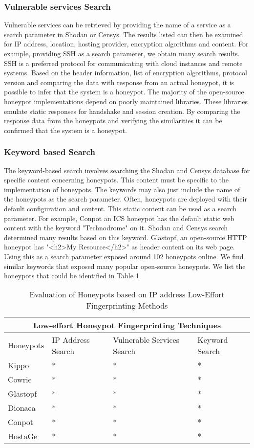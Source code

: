 \documentclass[../main.tex]{subfiles}
\begin{document}
 \subsubsection{Vulnerable services Search}
 Vulnerable services can be retrieved by providing the name of a service as a search parameter in Shodan or Censys. The results listed can then be examined for IP address, location, hosting provider, encryption algorithms and content. For example, providing SSH as a search parameter, we obtain many search results. SSH is a preferred protocol for communicating with cloud instances and remote systems. Based on the header information, list of encryption algorithms, protocol version and comparing the data with response from an actual honeypot, it is possible to infer that the system is a honeypot. The majority of the open-source honeypot implementations depend on poorly maintained libraries. These libraries emulate static responses for handshake and session creation. By comparing the response data from the honeypots and verifying the similarities it can be confirmed that the system is a honeypot. 
 
 \subsubsection{Keyword based Search}
The keyword-based search involves searching the Shodan and Censys database for specific content concerning honeypots. This content must be specific to the implementation of honeypots. The keywords may also just include the name of the honeypots as the search parameter. Often, honeypots are deployed with their default configuration and content. This static content can be used as a search parameter. For example, Conpot an ICS honeypot has the default static web content with the keyword "Technodrome" on it. Shodan and Censys search determined many results based on this keyword. Glastopf, an open-source HTTP honeypot has "<h2>My Resource</h2>" as header content on its web page. Using this as a search parameter exposed around 102 honeypots online. We find similar keywords that exposed many popular open-source honeypots. We list the honeypots that could be identified in Table \ref{Tab:IP address}

 \begin{table}[]
 \begin{tabular}{ |p{1.5cm}||p{1.5cm}||p{1.2cm}|p{1.4cm}| }
 \hline
 \multicolumn{4}{|c|}{Low-effort Honeypot Fingerprinting Techniques} \\
 \hline
 Honeypots & IP Address Search & Vulnerable Services Search & Keyword Search \\
 \hline
 Kippo   & *  &* & *  \\
 Cowrie  & *  &* & *  \\
 Glastopf& *  &* & *  \\
 Dionaea & *  &* & *  \\
 Conpot  & *  &* & *  \\
 HostaGe & *  &*  &  *  \\
 \hline
\end{tabular}
 \caption{Evaluation of Honeypots based on IP address Low-Effort Fingerprinting Methods}
 \label{Tab:IP address}
 \end{table}
\end{document}
